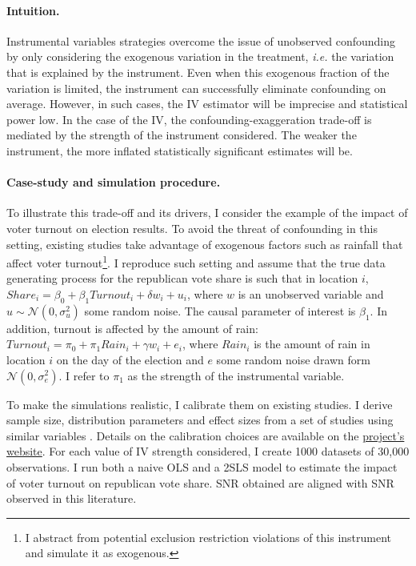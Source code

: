 \documentclass[usletter, 12pt]{article}
\begin{document}
                		\paragraph{Intuition.} 
        			Instrumental variables strategies overcome the issue of unobserved confounding by only considering the exogenous variation in the treatment, \textit{i.e.} the variation that is explained by the instrument. Even when this exogenous fraction of the variation is limited, the instrument can successfully eliminate confounding on average. However, in such cases, the IV estimator will be imprecise and statistical power low. In the case of the IV, the confounding-exaggeration trade-off is mediated by the strength of the instrument considered. The weaker the instrument, the more inflated statistically significant estimates will be.
        		
        			\paragraph{Case-study and simulation procedure.} 
        			To illustrate this trade-off and its drivers, I consider the example of the impact of voter turnout on election results. To avoid the threat of confounding in this setting, existing studies take advantage of exogenous factors such as rainfall that affect voter turnout\footnote{I abstract from potential exclusion restriction violations of this instrument and simulate it as exogenous.}. I reproduce such setting and assume that the true data generating process for the republican vote share is such that  in location $i$, $Share_{i} = \beta_{0} + \beta_{1} Turnout_{i} + \delta w_{i} + u_{i}$, where $w$ is an unobserved variable and $u \sim \mathcal{N}(0, \sigma_{u}^{2})$ some random noise. The causal parameter of interest is $\beta_{1}$. In addition, turnout is affected by the amount of rain: $Turnout_{i} = \pi_{0} + \pi_{1} Rain_{i} + \gamma w_{i} + e_{i}$, where $Rain_{i}$ is the amount of rain in location $i$ on the day of the election 
			and $e$ some random noise drawn form $\mathcal{N}(0, \sigma_{e}^{2})$. I refer to $\pi_{1}$ as the strength of the instrumental variable. 
        			
        			To make the simulations realistic, I calibrate them on existing studies. I derive sample size, distribution parameters and effect sizes from a set of studies using similar variables \citep{gomez_republicans_2007, fujiwara_habit_2016, cooperman_randomization_2017}. Details on the calibration choices are available on the \href{https://vincentbagilet.github.io/causal_exaggeration/IV.html#calibration-and-baseline-parameters-values}{project's website}. For each value of IV strength considered, I create 1000 datasets of 30,000 observations. I run both a naive OLS and a 2SLS model to estimate the impact of voter turnout on republican vote share. SNR obtained are aligned with SNR observed in this literature.
        			
\end{document}
